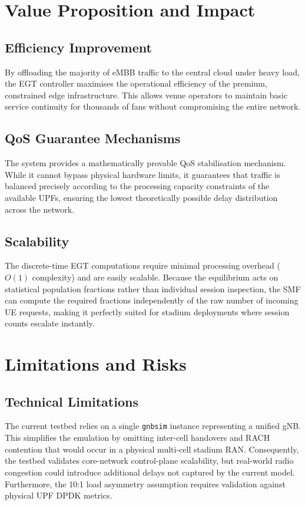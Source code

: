 \documentclass[11pt,a4paper,english]{article}
\begin{document}
\section{Value Proposition and Impact}
\subsection{Efficiency Improvement}
By offloading the majority of eMBB traffic to the central cloud under heavy load, the EGT controller maximises the operational efficiency of the premium, constrained edge infrastructure. This allows venue operators to maintain basic service continuity for thousands of fans without compromising the entire network.

\subsection{QoS Guarantee Mechanisms}
The system provides a mathematically provable QoS stabilisation mechanism. While it cannot bypass physical hardware limits, it guarantees that traffic is balanced precisely according to the processing capacity constraints of the available UPFs, ensuring the lowest theoretically possible delay distribution across the network.

\subsection{Scalability}
The discrete-time EGT computations require minimal processing overhead ($O(1)$ complexity) and are easily scalable. Because the equilibrium acts on statistical population fractions rather than individual session inspection, the SMF can compute the required fractions independently of the raw number of incoming UE requests, making it perfectly suited for stadium deployments where session counts escalate instantly.

\section{Limitations and Risks}
\subsection{Technical Limitations}
The current testbed relies on a single \texttt{gnbsim} instance representing a unified gNB. This simplifies the emulation by omitting inter-cell handovers and RACH contention that would occur in a physical multi-cell stadium RAN. Consequently, the testbed validates core-network control-plane scalability, but real-world radio congestion could introduce additional delays not captured by the current model. Furthermore, the 10:1 load asymmetry assumption requires validation against physical UPF DPDK metrics.
\end{document}

